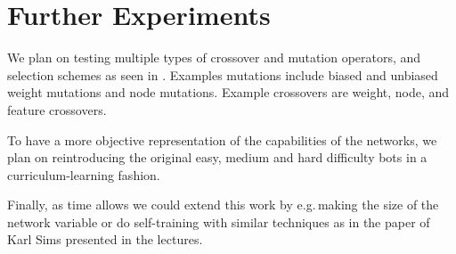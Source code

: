 \documentclass[11pt,a4paper]{scrartcl}
\begin{document}
\section*{Further Experiments}

We plan on testing multiple types of crossover and mutation operators, and selection schemes as seen in \cite{montana1989training}. Examples mutations include biased and unbiased weight mutations and node mutations. Example crossovers are weight, node, and feature crossovers.

To have a more objective representation of the capabilities of the networks, we plan on reintroducing the original easy, medium and hard difficulty bots in a curriculum-learning fashion.

Finally, as time allows we could extend this work by e.g.\,making the size of the network variable or do self-training with similar techniques as in the paper of Karl Sims\cite{sims1994evolving} presented in the lectures.

{}

\end{document}
